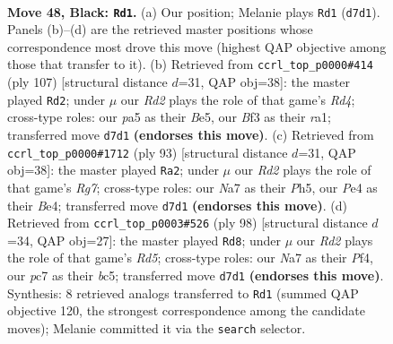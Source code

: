 \documentclass[11pt]{article}
\begin{document}
\clearpage

\begin{figure}[p]\centering
\begin{subfigure}{0.46\textwidth}\centering
\resizebox{\linewidth}{!}{%
\newchessgame
\chessboard[
  setfen={4K3/n1Pr3k/p7/P4p1p/4pB2/5bP1/8/RN6 b - - 3 48},
  showmover=false,
  pgfstyle=straightmove, color=movearrow, markmove={d7-d1}
]}
\caption{}
\end{subfigure}\hfill
\begin{subfigure}{0.46\textwidth}\centering
\resizebox{\linewidth}{!}{%
\newchessgame
\chessboard[
  setfen={8/5k2/pB3p2/P2rb3/2K4p/7P/5P2/R7 b - - 3 54},
  showmover=false,
  pgfstyle=straightmove, color=movearrow, markmove={d5-d2}
]}
\caption{}
\end{subfigure}
\\[4pt]
\begin{subfigure}{0.46\textwidth}\centering
\resizebox{\linewidth}{!}{%
\newchessgame
\chessboard[
  setfen={3B2k1/5p2/6p1/p6p/P3b2P/2R3P1/6r1/5K2 b - - 3 47},
  showmover=false,
  pgfstyle=straightmove, color=movearrow, markmove={g2-a2}
]}
\caption{}
\end{subfigure}\hfill
\begin{subfigure}{0.46\textwidth}\centering
\resizebox{\linewidth}{!}{%
\newchessgame
\chessboard[
  setfen={8/2r4p/Bp2k3/2bR1p1P/P1P2P2/5K2/8/8 w - - 19 50},
  showmover=false,
  pgfstyle=straightmove, color=movearrow, markmove={d5-d8}
]}
\caption{}
\end{subfigure}
\caption{\textbf{Move 48, Black: \texttt{Rd1}.} (a) Our position; Melanie plays \texttt{Rd1} (\texttt{d7d1}). Panels (b)--(d) are the retrieved master positions whose correspondence most drove this move (highest QAP objective among those that transfer to it). (b) Retrieved from \texttt{ccrl\_top\_p0000\#414} (ply 107) [structural distance $d$=31, QAP obj=38]: the master played \texttt{Rd2}; under $\mu$ our \emph{Rd2} plays the role of that game's \emph{Rd4}; cross-type roles: our \emph{p}a5 as their \emph{B}e5, our \emph{B}f3 as their \emph{r}a1; transferred move \texttt{d7d1} \textbf{(endorses this move)}. (c) Retrieved from \texttt{ccrl\_top\_p0000\#1712} (ply 93) [structural distance $d$=31, QAP obj=38]: the master played \texttt{Ra2}; under $\mu$ our \emph{Rd2} plays the role of that game's \emph{Rg7}; cross-type roles: our \emph{N}a7 as their \emph{P}h5, our \emph{P}e4 as their \emph{B}e4; transferred move \texttt{d7d1} \textbf{(endorses this move)}. (d) Retrieved from \texttt{ccrl\_top\_p0003\#526} (ply 98) [structural distance $d$=34, QAP obj=27]: the master played \texttt{Rd8}; under $\mu$ our \emph{Rd2} plays the role of that game's \emph{Rd5}; cross-type roles: our \emph{N}a7 as their \emph{P}f4, our \emph{p}c7 as their \emph{b}c5; transferred move \texttt{d7d1} \textbf{(endorses this move)}. Synthesis: 8 retrieved analogs transferred to \texttt{Rd1} (summed QAP objective 120, the strongest correspondence among the candidate moves); Melanie committed it via the \texttt{search} selector.}
\label{fig:thought-m95}
\end{figure}
\end{document}

